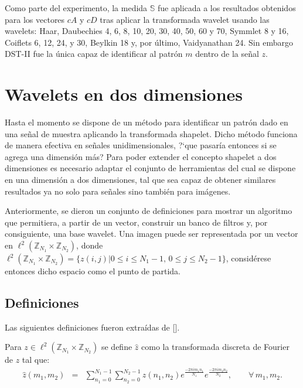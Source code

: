 \par Como parte del experimento, la medida $\mathbb{S}$ fue aplicada a los resultados obtenidos para los vectores $cA$ y $cD$ tras aplicar la transformada wavelet usando las wavelets: Haar, Daubechies 4, 6, 8, 10, 20, 30, 40, 50, 60 y 70, Symmlet 8 y 16, Coiﬂets 6, 12, 24, y 30, Beylkin 18 y, por \'ultimo, Vaidyanathan 24. Sin embargo DST-II fue la \'unica capaz de identificar al patr\'on $m$ dentro de la se\~nal $z$.

\section{Wavelets en dos dimensiones}\label{cap:w2d}

\par Hasta el momento se dispone de un m\'etodo para identificar un patr\'on dado en una se\~nal de muestra aplicando la transformada shapelet. Dicho m\'etodo funciona de manera efectiva en se\~nales unidimensionales, ?`que pasar\'ia entonces si se agrega una dimensi\'on m\'as? Para poder extender el concepto shapelet a dos dimensiones es necesario adaptar el conjunto de herramientas del cual se dispone en una dimensi\'on a dos dimensiones, tal que sea capaz de obtener similares resultados ya no solo para se\~nales sino tambi\'en para im\'agenes.\\

\par Anteriormente, se dieron un conjunto de definiciones para mostrar un algoritmo que permitiera, a partir de un vector, construir un banco de filtros y, por consiguiente, una base wavelet. Una imagen puede ser representada por un vector en $\ell^2(\mathbb{Z}_{N_1}\times\mathbb{Z}_{N_2})$, donde $\ell^2(\mathbb{Z}_{N_1}\times\mathbb{Z}_{N_2})=\{z(i,j)|0\leq i \leq N_1-1,\,0\leq j\leq N_2-1\}$, consid\'erese entonces dicho espacio como el punto de partida.

\subsection{Definiciones}

\par Las siguientes definiciones fueron extra\'idas de [\textcolor{cyan}{\cite{12}}].\\

\begin{definition}
Para $z\in \ell^2(\mathbb{Z}_{N_1}\times\mathbb{Z}_{N_2})$ se define $\hat{z}$ como la transformada discreta de Fourier de $z$ tal que:
\begin{eqnarray}
\hat{z}(m_1,m_2)&=&\sum_{n_1=0}^{N_1-1}\sum_{n_2=0}^{N_2-1}z(n_1,n_2)e^{\frac{-2\pi im_1n_1}{N_1}}e^{\frac{-2\pi im_2n_2}{N_2}},\qquad\forall\,m_1,m_2.\nonumber
\end{eqnarray}
\end{definition}

